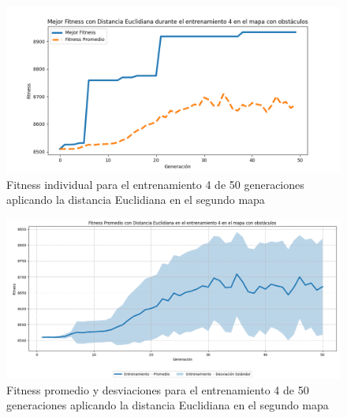 \documentclass[conference]{IEEEtran}
\begin{document}
\begin{figure}[H]
    \centering
    \includegraphics[width=0.9 \linewidth]{Euclidiana/Mapa2/Fitness_4_Map2_Eucli_50Gen.png}
    \caption{Fitness individual para el entrenamiento 4 de 50 generaciones aplicando la distancia Euclidiana en el segundo mapa}
    \label{fig:eucli_4_50_m2}
\end{figure}
\begin{figure}[H]
    \centering
    \includegraphics[width=0.9 \linewidth]{Euclidiana/Mapa2/Fitness_4_Map2_Eucli_50Gen_Sombra.png}
    \caption{Fitness promedio y desviaciones para el entrenamiento 4 de 50 generaciones aplicando la distancia Euclidiana en el segundo mapa}
    \label{fig:eucli_4_50_sombra_m2}
\end{figure}
\end{document}
